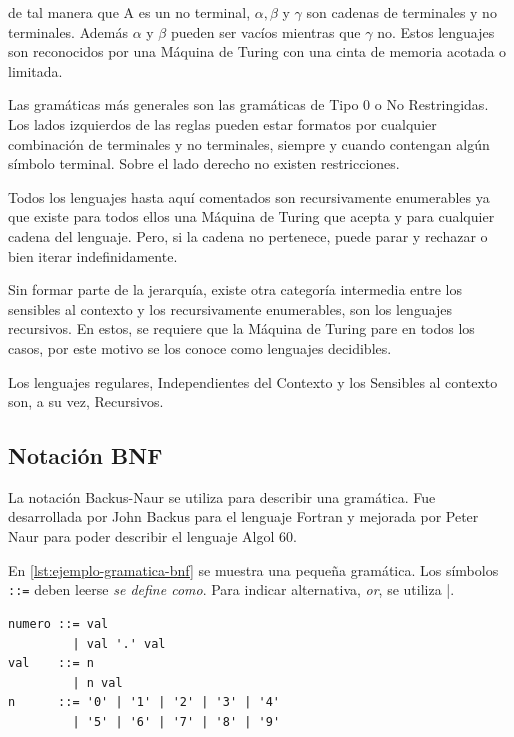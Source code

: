 de tal manera que A es un no terminal, $\alpha, \beta$ y $\gamma$ son cadenas de terminales y no terminales. Además $\alpha$ y $\beta$ pueden ser vacíos mientras que $\gamma$ no.
Estos lenguajes son reconocidos por una Máquina de Turing con una cinta de memoria acotada o limitada.

Las gramáticas más generales son las gramáticas de Tipo 0 o No Restringidas. Los lados izquierdos de las reglas pueden estar formatos por cualquier combinación de terminales y no terminales, siempre y cuando contengan algún símbolo terminal. Sobre el lado derecho no existen restricciones.

Todos los lenguajes hasta aquí comentados son recursivamente enumerables ya que existe para todos ellos una Máquina de Turing que acepta y para cualquier cadena del lenguaje. Pero, si la cadena no pertenece, puede parar y rechazar o bien iterar indefinidamente.

Sin formar parte de la jerarquía, existe otra categoría intermedia entre los sensibles al contexto y los recursivamente enumerables, son los lenguajes recursivos. En estos, se requiere que la Máquina de Turing pare en todos los casos, por este motivo se los conoce como lenguajes decidibles.

Los lenguajes regulares, Independientes del Contexto y los Sensibles al contexto son, a su vez, Recursivos.

\subsection{Notación BNF}

La notación Backus-Naur se utiliza para describir una gramática. Fue desarrollada por John Backus para el lenguaje Fortran y mejorada por Peter Naur para poder describir el lenguaje Algol 60.

En \ref{lst:ejemplo-gramatica-bnf} se muestra una pequeña gramática. Los símbolos \verb|::=| deben leerse \emph{se define como}. Para indicar alternativa, \emph{or}, se utiliza \verb|||.

\begin{lstlisting}[caption={Gramática en notación BNF},label=lst:ejemplo-gramatica-bnf]
numero ::= val
         | val '.' val
val    ::= n
         | n val
n      ::= '0' | '1' | '2' | '3' | '4'
         | '5' | '6' | '7' | '8' | '9'
\end{lstlisting}

